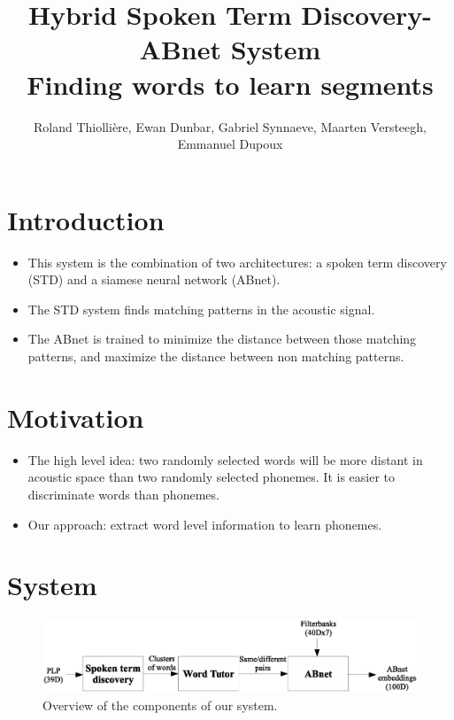 \documentclass[final]{beamer}
\title
[Interspeech (2015, Dresden, Germany)] %
{ %
Hybrid Spoken Term Discovery-ABnet System\\
Finding words to learn segments
}
\author{ %
Roland Thiolli\`ere\inst{*}, Ewan Dunbar\inst{*}, Gabriel Synnaeve\inst{*\dagger}, Maarten Versteegh\inst{*}, Emmanuel Dupoux\inst{*}
}
\institute
[ENS] %
{
\inst{*} LSCP, \'{E}cole Normale Sup\'{e}rieure / EHESS / CNRS, Paris, France\\%
\inst{\dagger} now at Facebook AI Research\\[0.5ex]
\inst{} \begin{small}\texttt{rolthiolliere@gmail.com, emd@umd.edu, gabrielsynnaeve@gmail.com, maartenversteegh@gmail.com, emmanuel.dupoux@gmail.com}\end{small}
}
\newcommand{\abnet}{{\sc ABnet}}
\begin{document}
\begin{frame}[t]
\begin{multicols}{3} %

\section{Introduction}

\begin{itemize}
\item This system is the combination of two architectures: a spoken term discovery\cite{jansenvandurme2011} (STD) and a siamese neural network\cite{synnaevedupoux2014} (\abnet{}).
\item The STD system finds matching patterns in the acoustic signal.
\item The \abnet{} is trained to minimize the distance between those matching patterns, and maximize the distance between non matching patterns.
\end{itemize}



\section{Motivation}

\begin{itemize}
\item The high level idea: two randomly selected words will be more distant in acoustic space than two randomly selected phonemes. It is easier to discriminate words than phonemes.
\item Our approach: extract word level information to learn phonemes.
\end{itemize}


\section{System}

\begin{figure}[ht!]
  \begin{center}
    \includegraphics[width=\columnwidth]{system}
    \caption{\label{fig:system}Overview of the components of our system.}
  \end{center}
\end{figure}


\end{multicols}
\end{frame}
\end{document}
